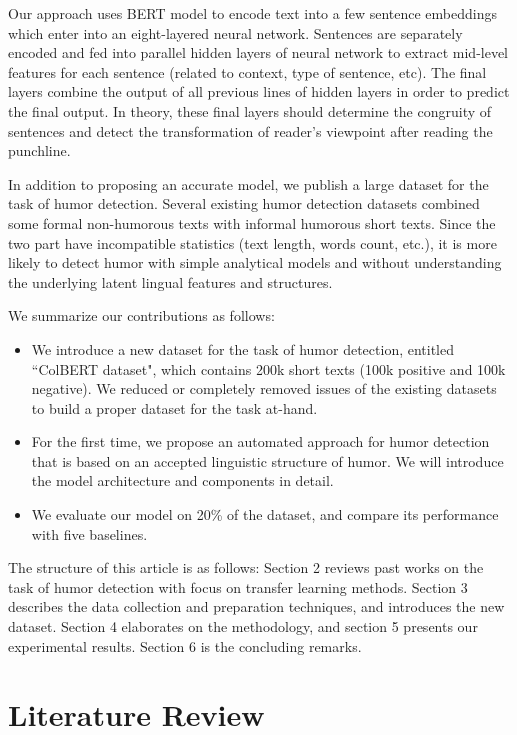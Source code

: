 \documentclass[journal]{IEEEtran}
\begin{document}
Our approach uses BERT model to encode text into a few sentence embeddings which enter into an eight-layered neural network. Sentences are separately encoded and fed into parallel hidden layers of neural network to extract mid-level features for each sentence (related to context, type of sentence, etc). The final layers combine the output of all previous lines of hidden layers in order to predict the final output. In theory, these final layers should determine the congruity of sentences and detect the transformation of reader's viewpoint after reading the punchline.

In addition to proposing an accurate model, we publish a large dataset for the task of humor detection. Several existing humor detection datasets combined some formal non-humorous texts with informal humorous short texts. Since the two part have incompatible statistics (text length, words count, etc.), it is more likely to detect humor with simple analytical models and without understanding the underlying latent lingual features and structures.

We summarize our contributions as follows:
\begin{itemize}

\item We introduce a new dataset for the task of humor detection, entitled “ColBERT dataset", which contains 200k short texts (100k positive and 100k negative). We reduced or completely removed issues of the existing datasets to build a proper dataset for the task at-hand.
\item For the first time, we propose an automated approach for humor detection that is based on an accepted linguistic structure of humor. We will introduce the model architecture and components in detail.
\item We evaluate our model on 20\% of the dataset, and compare its performance with five baselines.
\end{itemize}

 The structure of this article is as follows: Section 2 reviews past works on the task of humor detection with focus on transfer learning methods. Section 3 describes the data collection and preparation techniques, and introduces the new dataset. Section 4 elaborates on the methodology, and section 5 presents our experimental results. Section 6 is the concluding remarks. 



\section{Literature Review}
\end{document}
